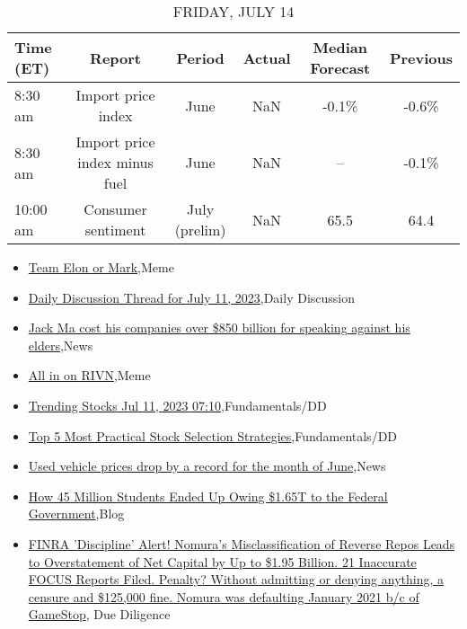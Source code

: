 \documentclass{article}%
\begin{document}
%


\begin{table}[htbp]%
\caption{FRIDAY, JULY 14}%
\centering%
\begin{adjustbox}{width=1\textwidth}%
\begin{tabular}{lccccc}
\toprule
Time (ET) &                        Report &        Period & Actual & Median Forecast & Previous \\
\midrule
  8:30 am &            Import price index &          June &    NaN &           -0.1\% &    -0.6\% \\
  8:30 am & Import price index minus fuel &          June &    NaN &              -- &    -0.1\% \\
 10:00 am &            Consumer sentiment & July (prelim) &    NaN &            65.5 &     64.4 \\
\bottomrule
\end{tabular}
%
\end{adjustbox}%
\end{table}

%
\begin{itemize}%
\item%
\href{https://reddit.com/r/wallstreetbets/comments/14woyw8/team\_elon\_or\_mark/}{Team Elon or Mark},Meme%
\item%
\href{https://reddit.com/r/wallstreetbets/comments/14wmw46/daily\_discussion\_thread\_for\_july\_11\_2023/}{Daily Discussion Thread for July 11, 2023},Daily Discussion%
\item%
\href{https://reddit.com/r/wallstreetbets/comments/14wh8s6/jack\_ma\_cost\_his\_companies\_over\_850\_billion\_for/}{Jack Ma cost his companies over \$850 billion for speaking against his elders},News%
\item%
\href{https://reddit.com/r/wallstreetbets/comments/14wgsh8/all\_in\_on\_rivn/}{All in on RIVN},Meme%
\item%
\href{https://reddit.com/r/StockMarket/comments/14wob9l/trending\_stocks\_jul\_11\_2023\_0710/}{Trending Stocks Jul 11, 2023 07:10},Fundamentals/DD%
\item%
\href{https://reddit.com/r/StockMarket/comments/14wmwf8/top\_5\_most\_practical\_stock\_selection\_strategies/}{Top 5 Most Practical Stock Selection Strategies},Fundamentals/DD%
\item%
\href{https://reddit.com/r/Economics/comments/14wcdz3/used\_vehicle\_prices\_drop\_by\_a\_record\_for\_the/}{Used vehicle prices drop by a record for the month of June},News%
\item%
\href{https://reddit.com/r/Economics/comments/14w9hnf/how\_45\_million\_students\_ended\_up\_owing\_165t\_to/}{How 45 Million Students Ended Up Owing \$1.65T to the Federal Government},Blog%
\item%
\href{https://reddit.com/r/Superstonk/comments/14wgz8q/finra\_discipline\_alert\_nomuras\_misclassification/}{FINRA 'Discipline' Alert! Nomura's Misclassification of Reverse Repos Leads to Overstatement of Net Capital by Up to \$1.95 Billion. 21 Inaccurate FOCUS Reports Filed. Penalty? Without admitting or denying anything, a censure and \$125,000 fine. Nomura was defaulting January 2021 b/c of GameStop}, Due Diligence%
\end{itemize}%
\end{document}

